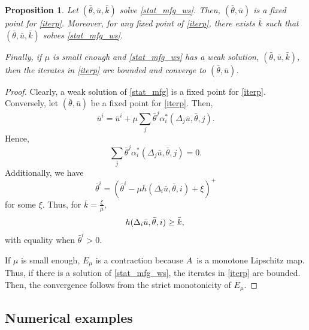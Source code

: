 \documentclass[12pt]{amsart}
\newcommand{\1}{{\chi}}
\newtheorem{pro}{Proposition}
\theoremstyle{definition}
\begin{document}
\begin{pro}
Let $(\bar \theta, \bar u, \bar k)$ solve \eqref{stat_mfg_ws}. Then, $(\bar \theta, \bar u )$ is a fixed point for \eqref{iterp}. Moreover, for any fixed point of  \eqref{iterp}, there exists $\bar k$ such that 
$(\bar \theta, \bar u, \bar k)$ solves  \eqref{stat_mfg_ws}.
 
Finally, if $\mu$ is small enough and \eqref{stat_mfg_ws} has a weak solution, $(\bar \theta, \bar u, \bar k)$, then
the iterates in \eqref{iterp} are bounded and converge to  $(\bar \theta, \bar u )$.
\end{pro}
\begin{proof}
Clearly, a weak solution of  \eqref{stat_mfg} is a fixed point for \eqref{iterp}. Conversely, let  $(\bar \theta, \bar u )$ be a fixed point for \eqref{iterp}. Then, 
\[
\bar u^i=\bar u^i+\mu \sum_{j} \bar \theta^j \alpha^*_i (\Delta_j \bar u, \bar \theta,j).
\]
Hence, \[\sum_{j} \bar \theta^j \alpha^*_i (\Delta_j \bar u, \bar \theta,j)=0.\]
Additionally, we have
\[
\bar \theta^i=\left(\bar \theta^i- \mu  h(\Delta_i \bar u, \bar \theta, i) +\xi\right)^+ \]
for some $\xi$. Thus, for $\bar k=\frac \xi \mu$, 
\[
        h(\Delta_i \bar u, \bar \theta, i) \geq   \bar k, \\
\]
with equality when $\bar \theta^i>0$.

If $\mu$ is small enough, $E_\mu$ is a contraction because $A$\ is a monotone Lipschitz map.  Thus,  if there is a solution of  \eqref{stat_mfg_ws}, the iterates in  \eqref{iterp} are bounded. Then, the convergence follows from the strict monotonicity of  $E_\mu$.      
\end{proof}

\subsection{Numerical examples} 
        	




	


	
	
		
		
		
		
		
		
		
		
		
		
		
		
    
\end{document}
